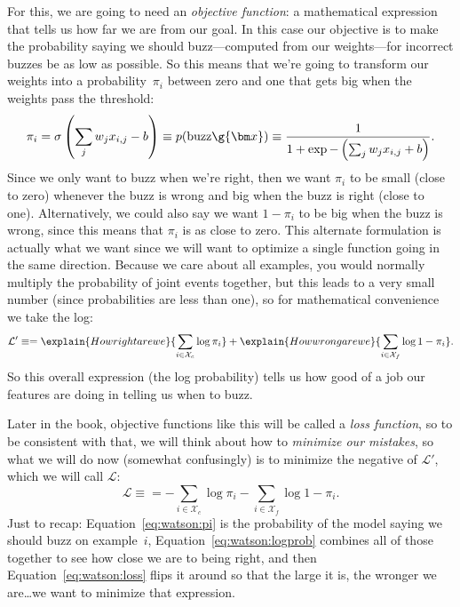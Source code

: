 For this, we are going to need an \emph{objective function}: a mathematical
expression that tells us how far we are from our goal.
%
In this case our objective is to make the probability saying we should
buzz---computed from our weights---for incorrect buzzes be as low as possible.
%
So this means that we're going to transform our weights into a
probability~$\pi_i$ between zero and one that gets big when the weights pass the threshold:
%
\begin{equation}
  \pi_i = \sigma \left( \sum_j w_{j} x_{i,j} - b \right) \equiv p(\mbox{buzz} \g {\bm x}) \equiv \frac{1}{1+\exp{-\left(\sum_{j} w_j
        x_{i,j} + b \right)}}.
  \label{eq:watson:pi}
\end{equation}
%
Since we only want to buzz when we're right, then we want $\pi_i$ to be small
(close to zero) whenever the buzz is wrong and big when the buzz is right
(close to one).
%
Alternatively, we could also say we want $1-\pi_i$ to be big when the buzz is
wrong, since this means that $\pi_i$ is as close to zero.
%
This alternate formulation is actually what we want since we will want to
optimize a single function going in the same direction.
%
Because we care about all examples, you would normally multiply the
probability of joint events together, but this leads to a very small number
(since probabilities are less than one), so for mathematical convenience we
take the log:
\begin{equation}
  \mathcal{L}' \equiv = \explain{How right are we}{\sum_{i \in \mathcal{X}_c}
    \log{\pi_i}} + \explain{How wrong are we}{\sum_{i \in
      \mathcal{X}_f} \log{1 - \pi_i}}.
  \label{eq:watson:logprob}
\end{equation}
So this overall expression (the log probability) tells us how good of a job
our features are doing in telling us when to buzz.

Later in the book, objective functions like this will be called a \emph{loss
  function}, so to be consistent with that, we will think about how to
\emph{minimize our mistakes}, so what we will do now (somewhat confusingly) is
to minimize the negative of $\mathcal{L}'$, which we will call $\mathcal{L}$:
\begin{equation}
  \mathcal{L} \equiv = -\sum_{i \in \mathcal{X}_c}
    \log{\pi_i} - \sum_{i \in
    \mathcal{X}_f} \log{1 - \pi_i}.
  \label{eq:watson:loss}
\end{equation}
Just to recap: Equation~\ref{eq:watson:pi} is the probability of the model
saying we should buzz on example~$i$, Equation~\ref{eq:watson:logprob}
combines all of those together to see how close we are to being right, and
then Equation~\ref{eq:watson:loss} flips it around so that the large it is,
the wronger we are\dots we want to minimize that expression.

